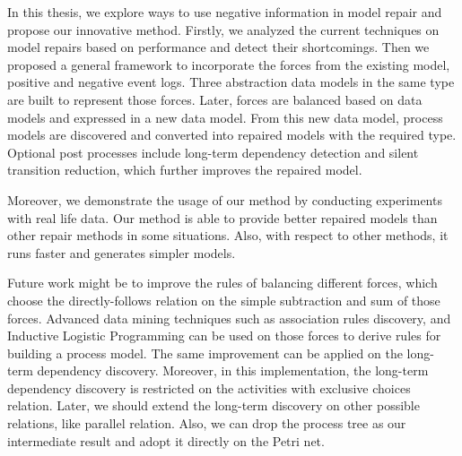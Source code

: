 
In this thesis, we explore ways to use negative information in model repair and propose our innovative method. Firstly, we analyzed the current techniques on model repairs based on performance and detect their shortcomings. Then we  proposed a general framework to incorporate the forces from the existing model, positive and negative event logs. Three abstraction data models in the same type are built to represent those forces. Later, forces are balanced based on data models and expressed in a new data model. From this new data model, process models are discovered and converted into repaired models with the required type. Optional post processes include long-term dependency detection and silent transition reduction, which further improves the repaired model. 

Moreover, we demonstrate the usage of our method by conducting experiments with real life data. Our method is able to provide better repaired models than other repair methods in some situations. Also, with respect to other methods, it runs faster and generates simpler models. 

Future work might be to improve the rules of balancing different forces, which choose the directly-follows relation on the simple subtraction and sum of those forces. Advanced data mining techniques such as association rules discovery, and Inductive Logistic Programming can be used on those forces to derive rules for building a process model. The same improvement can be applied on the long-term dependency discovery. Moreover, in this implementation, the long-term dependency discovery is restricted on the activities with exclusive choices relation. Later, we should extend the long-term discovery on other possible relations, like parallel relation. Also, we can drop the process tree as our intermediate result and adopt it directly on the Petri net. 

